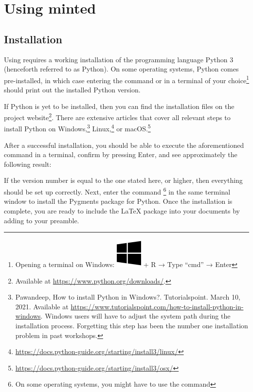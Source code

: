 \section{Using minted}

\subsection{Installation}
Using  requires a working installation of the programming language Python 3 (henceforth referred to as Python).
On some operating systems, Python comes pre-installed, in which case entering the command  or  in a terminal of your choice\footnote{Opening a terminal on Windows: \includegraphics[width=.7em]{graphics/faWindows.png} + R → Type \enquote{cmd} → Enter} should print out the installed Python version.

If Python is yet to be installed, then you can find the installation files on the project website\footnote{Available at \url{https://www.python.org/downloads/}.}.
There are extensive articles that cover all relevant steps to install Python on 
Windows,\footnote{Pawandeep, How to install Python in Windows?. Tutorialspoint. March 10, 2021. Available at 
\url{https://www.tutorialspoint.com/how-to-install-python-in-windows}. 
Windows users will have to adjust the system path during the installation process. Forgetting this step has 
been the number one installation problem in past workshops.} 
Linux,\footnote{\url{https://docs.python-guide.org/starting/install3/linux/}} 
or macOS.\footnote{\url{https://docs.python-guide.org/starting/install3/osx/}}

After a successful installation, you should be able to execute the aforementioned command in a terminal, confirm by pressing Enter, and see approximately the following result: 


\noindent If the version number is equal to the one stated here, or higher, then everything should be set up correctly.
Next, enter the command \footnote{On some operating systems, you might have to use the command } in the same terminal window to install the Pygments package for Python.
Once the installation is complete, you are ready to include the \LaTeX{} package  into your documents by adding  to your preamble.


